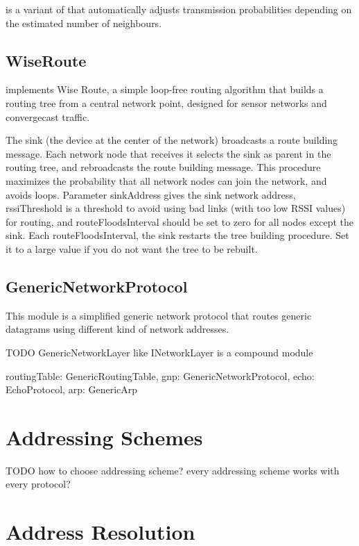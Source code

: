 
 is a variant of
 that automatically adjusts transmission
probabilities depending on the estimated number of neighbours.

\subsection{WiseRoute}

 implements Wise Route, a simple loop-free routing algorithm
that builds a routing tree from a central network point, designed for sensor
networks and convergecast traffic.

The sink (the device at the center of the network) broadcasts
a route building message. Each network node that receives it
selects the sink as parent in the routing tree, and rebroadcasts
the route building message. This procedure maximizes the probability
that all network nodes can join the network, and avoids loops.
Parameter sinkAddress gives the sink network address,
rssiThreshold is a threshold to avoid using bad links (with too low
RSSI values) for routing, and routeFloodsInterval should be set to
zero for all nodes except the sink. Each routeFloodsInterval, the
sink restarts the tree building procedure. Set it to a large value
if you do not want the tree to be rebuilt.

\subsection{GenericNetworkProtocol}

This module is a simplified generic network protocol that routes
generic datagrams using different kind of network addresses. 

TODO GenericNetworkLayer like INetworkLayer  is a compound module

routingTable: GenericRoutingTable,
gnp: GenericNetworkProtocol,
echo: EchoProtocol,
arp: GenericArp



\section{Addressing Schemes}

TODO how to choose addressing scheme?  every addressing scheme works with every protocol?
  
\section{Address Resolution}

